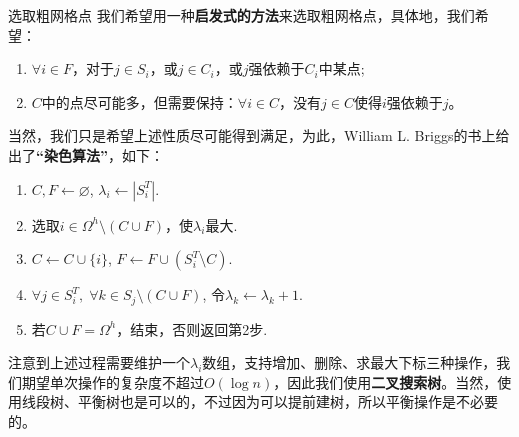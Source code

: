 \documentclass[9pt]{beamer}
\begin{document}
\begin{frame}{选取粗网格点}
\small
我们希望用一种\textbf{启发式的方法}来选取粗网格点，具体地，我们希望：
\begin{enumerate}[(1)]
  \item $\forall i\in F$，对于$j\in S_i$，或$j\in C_i$，或$j$强依赖于$C_i$中某点;
  \item $C$中的点尽可能多，但需要保持：$\forall i\in C$，没有$j\in C$使得$i$强依赖于$j$。
\end{enumerate}

\pause
\vspace{1em}
当然，我们只是希望上述性质尽可能得到满足，为此，William L. Briggs的书上给出了\textbf{“染色算法”}，如下：
\begin{enumerate}[1]
  \item $C,F\gets \varnothing$, $\lambda_i\gets |S_i^T|$.
  \item 选取$i\in\Omega^h\setminus(C\cup F)$，使$\lambda_i$最大.
  \item $C\gets C\cup\{i\}$, $F\gets F\cup (S_i^T\setminus C)$.
  \item $\forall j\in S_i^T,\;\forall k\in S_j\setminus(C\cup F)$, 令$\lambda_k\gets \lambda_k+1$.
  \item 若$C\cup F=\Omega^h$，结束，否则返回第2步.
\end{enumerate}

\pause
\vspace{1em}
注意到上述过程需要维护一个$\lambda_i$数组，支持增加、删除、求最大下标三种操作，我们期望单次操作的复杂度不超过$O(\log n)$，因此我们使用\textbf{二叉搜索树}。当然，使用线段树、平衡树也是可以的，不过因为可以提前建树，所以平衡操作是不必要的。
\end{frame}
\end{document}
